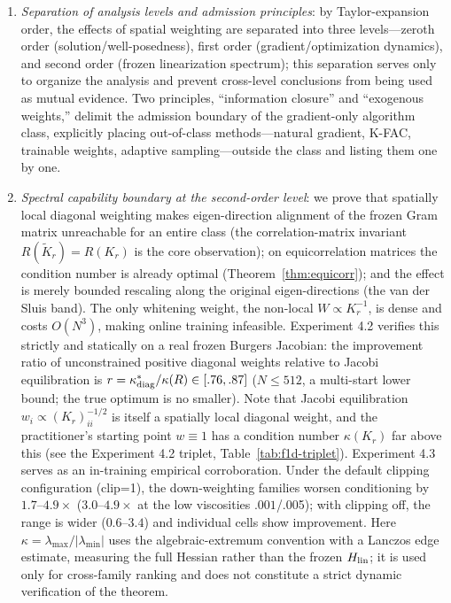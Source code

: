 \documentclass[11pt]{article}
\newcommand{\W}{W}
\numberwithin{equation}{section}
\begin{document}
\begin{enumerate}[label=(\arabic*),leftmargin=2em,itemsep=2pt]
\item \emph{Separation of analysis levels and admission principles}: by Taylor-expansion order, the effects of spatial weighting are separated into three levels---zeroth order (solution/well-posedness), first order (gradient/optimization dynamics), and second order (frozen linearization spectrum); this separation serves only to organize the analysis and prevent cross-level conclusions from being used as mutual evidence. Two principles, ``information closure'' and ``exogenous weights,'' delimit the admission boundary of the gradient-only algorithm class, explicitly placing out-of-class methods---natural gradient, K-FAC, trainable weights, adaptive sampling---outside the class and listing them one by one.
\item \emph{Spectral capability boundary at the second-order level}: we prove that spatially local diagonal weighting makes eigen-direction alignment of the frozen Gram matrix unreachable for an entire class (the correlation-matrix invariant $R(\tilde K_r)=R(K_r)$ is the core observation); on equicorrelation matrices the condition number is already optimal (Theorem~\ref{thm:equicorr}); and the effect is merely bounded rescaling along the original eigen-directions (the van der Sluis band). The only whitening weight, the non-local $\W\propto K_r^{-1}$, is dense and costs $O(N^3)$, making online training infeasible. Experiment 4.2 verifies this strictly and statically on a real frozen Burgers Jacobian: the improvement ratio of unconstrained positive diagonal weights relative to Jacobi equilibration is $r=\kappa^*_{\rm diag}/\kappa(R)\in[.76,.87]$ ($N\le512$, a multi-start lower bound; the true optimum is no smaller). Note that Jacobi equilibration $w_i\propto(K_r)_{ii}^{-1/2}$ is itself a spatially local diagonal weight, and the practitioner's starting point $w\equiv1$ has a condition number $\kappa(K_r)$ far above this (see the Experiment 4.2 triplet, Table~\ref{tab:f1d-triplet}). Experiment 4.3 serves as an in-training empirical corroboration. Under the default clipping configuration (clip=1), the down-weighting families worsen conditioning by $1.7$--$4.9\times$ ($3.0$--$4.9\times$ at the low viscosities $.001$/.005); with clipping off, the range is wider ($0.6$--$3.4$) and individual cells show improvement. Here $\kappa=\lambda_{\max}/|\lambda_{\min}|$ uses the algebraic-extremum convention with a Lanczos edge estimate, measuring the full Hessian rather than the frozen $H_{\rm lin}$; it is used only for cross-family ranking and does not constitute a strict dynamic verification of the theorem.

\end{enumerate}
\end{document}
